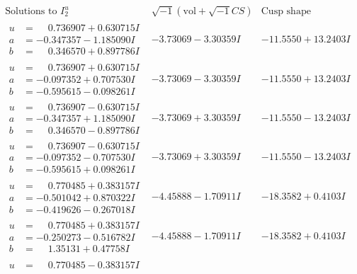 \documentclass[1p]{elsarticle_modified}
\theoremstyle{definition}
\newcommand{\I}{\sqrt{-1}}
\begin{document}
$$\begin{array}{c|c|c}  
\text{Solutions to }I^u_{2}& \I (\text{vol} + \sqrt{-1}CS) & \text{Cusp shape}\\
 \hline 
\begin{aligned}
u &= \phantom{-}0.736907 + 0.630715 I \\
a &= -0.347357 - 1.185090 I \\
b &= \phantom{-}0.346570 + 0.897786 I\end{aligned}
 & -3.73069 - 3.30359 I & -11.5550 + 13.2403 I \\ \hline\begin{aligned}
u &= \phantom{-}0.736907 + 0.630715 I \\
a &= -0.097352 + 0.707530 I \\
b &= -0.595615 - 0.098261 I\end{aligned}
 & -3.73069 - 3.30359 I & -11.5550 + 13.2403 I \\ \hline\begin{aligned}
u &= \phantom{-}0.736907 - 0.630715 I \\
a &= -0.347357 + 1.185090 I \\
b &= \phantom{-}0.346570 - 0.897786 I\end{aligned}
 & -3.73069 + 3.30359 I & -11.5550 - 13.2403 I \\ \hline\begin{aligned}
u &= \phantom{-}0.736907 - 0.630715 I \\
a &= -0.097352 - 0.707530 I \\
b &= -0.595615 + 0.098261 I\end{aligned}
 & -3.73069 + 3.30359 I & -11.5550 - 13.2403 I \\ \hline\begin{aligned}
u &= \phantom{-}0.770485 + 0.383157 I \\
a &= -0.501042 + 0.870322 I \\
b &= -0.419626 - 0.267018 I\end{aligned}
 & -4.45888 - 1.70911 I & -18.3582 + 0.4103 I \\ \hline\begin{aligned}
u &= \phantom{-}0.770485 + 0.383157 I \\
a &= -0.250273 - 0.516782 I \\
b &= \phantom{-}1.35131 + 0.47758 I\end{aligned}
 & -4.45888 - 1.70911 I & -18.3582 + 0.4103 I \\ \hline\begin{aligned}
u &= \phantom{-}0.770485 - 0.383157 I \\

\end{aligned}
\end{array}$$
\end{document}
